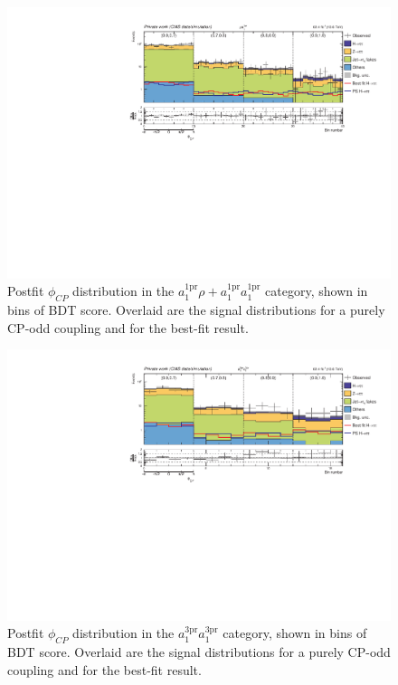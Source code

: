 \begin{figure}[!htbp]
    \centering
    \includegraphics[width=1\textwidth]{Figures/Chapter7/postfit/htt_tt_4_13p6TeV.pdf}
    \caption[Postfit $\phi_{CP}$ distribution in the $a_1^\text{1pr}\rho + a_1^\text{1pr}a_1^\text{1pr}$ category.]
    {Postfit $\phi_{CP}$ distribution in the $a_1^\text{1pr}\rho + a_1^\text{1pr}a_1^\text{1pr}$ category, shown in bins of \ac{BDT} score. Overlaid are the signal distributions for a purely CP-odd coupling and for the best-fit result.}
    \label{Figure:Chapter7_Postfit_Unrolled_6}
\end{figure}

\begin{figure}[!htbp]
    \centering
    \includegraphics[width=1\textwidth]{Figures/Chapter7/postfit/htt_tt_6_13p6TeV.pdf}
    \caption[Postfit $\phi_{CP}$ distribution in the $a_1^\text{3pr}a_1^\text{3pr}$ category.]
    {Postfit $\phi_{CP}$ distribution in the $a_1^\text{3pr}a_1^\text{3pr}$ category, shown in bins of \ac{BDT} score. Overlaid are the signal distributions for a purely CP-odd coupling and for the best-fit result.}
    \label{Figure:Chapter7_Postfit_Unrolled_7}
\end{figure}

